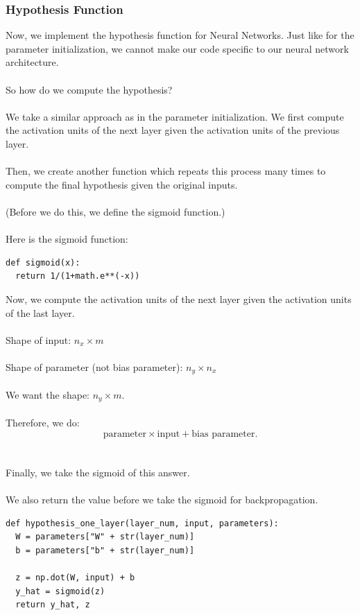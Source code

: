 \documentclass{article}
\begin{document}
\subsubsection{Hypothesis Function}
Now, we implement the hypothesis function for Neural Networks. Just like for the parameter initialization, we cannot make our code specific to our neural network architecture.
\\
\\
So how do we compute the hypothesis? 
\\
\\
We take a similar approach as in the parameter initialization. We first compute the activation units of the next layer given the activation units of the previous layer.
\\
\\
Then, we create another function which repeats this process many times to compute the final hypothesis given the original inputs.
\\
\\
(Before we do this, we define the sigmoid function.)
\\
\\
Here is the sigmoid function:
\begin{lstlisting}
def sigmoid(x):
  return 1/(1+math.e**(-x))
\end{lstlisting}

Now, we compute the activation units of the next layer given the activation units of the last layer. 
\\
\\
Shape of input: $n_x\times m$
\\
\\
Shape of parameter (not bias parameter): $n_y\times n_x$
\\
\\
We want the shape: $n_y\times m$. 
\\
\\
Therefore, we do: 
$$\text{parameter}\times \text{input} + \text{bias parameter}.$$
\\
\\
Finally, we take the sigmoid of this answer.
\\
\\
We also return the value before we take the sigmoid for backpropagation.

\begin{lstlisting}
def hypothesis_one_layer(layer_num, input, parameters):
  W = parameters["W" + str(layer_num)]
  b = parameters["b" + str(layer_num)]

  z = np.dot(W, input) + b
  y_hat = sigmoid(z)
  return y_hat, z
\end{lstlisting}
\end{document}
